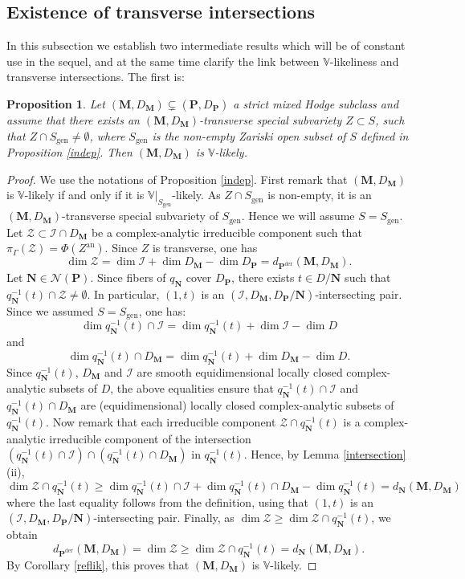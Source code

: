 \documentclass[10pt]{article}
\numberwithin{equation}{subsection}
\theoremstyle{plain}
\newtheorem{proposition}[theorem]{Proposition}
\theoremstyle{definition}
\theoremstyle{remark}
\newcommand{\I}{\mathscr{I}}
\newcommand{\V}{\mathbb V}
\newcommand{\pp}{\mathbf P}
\newcommand{\M}{\mathbf M}
\newcommand{\NN}{\mathbf N}
\newcommand{\an}{\mathrm{an}}
\newcommand{\der}{\mathrm{der}}
\newcommand{\Np}{\mathcal{N}(\pp)}
\newcommand{\gen}{\mathrm{gen}}
\newcommand{\Zcal}{\mathscr{Z}}
\begin{document}
\subsection{Existence of transverse intersections}
In this subsection we establish two intermediate results which will be of constant use in the sequel, and at the same time clarify the link between $\V$-likeliness and transverse intersections. The first is:
\begin{proposition}\label{nec}
Let $(\M, D_\M)\subsetneq (\pp,D_\pp)$ a strict mixed Hodge subclass and assume that there exists an $(\M,D_\M)$-transverse special subvariety $Z \subset S$, such that $Z \cap S_\gen \neq \emptyset$, where $S_\gen$ is the non-empty Zariski open subset of $S$ defined in Proposition \ref{indep}. Then $(\M,D_\M)$ is $\V$-likely.
\end{proposition}
\begin{proof}
We use the notations of Proposition \ref{indep}. First remark that $(\M,D_\M)$ is $\V$-likely if and only if it is $\V \vert_{S_\gen}$-likely. As $Z \cap S_\gen$ is non-empty, it is an $(\M,D_\M)$-transverse special subvariety of $S_\gen$. Hence we will assume $S = S_\gen$. Let $\Zcal \subset \I \cap D_\M$ be a complex-analytic irreducible component such that $\pi_\Gamma(\Zcal) = \Phi(Z^\an)$. Since $Z$ is transverse, one has
\[
\dim \Zcal = \dim \I + \dim D_\M - \dim D_\pp = d_{\pp^\der}(\M, D_\M).
\]
Let $\NN \in \Np$. Since fibers of $q_\NN$ cover $D_\pp$, there exists $t \in D/\NN$ such that $q_\NN^{-1}(t) \cap \Zcal \neq \emptyset$. In particular, $(1, t)$ is an $(\I, D_\M, D_\pp/\NN)$-intersecting pair. Since we assumed $S = S_\gen$, one has:
\[
\dim q_\NN^{-1}(t) \cap \I = \dim q_\NN^{-1}(t) + \dim \I - \dim D
\]
and
\[
\dim q_\NN^{-1}(t) \cap D_\M = \dim q_\NN^{-1}(t) + \dim D_\M - \dim D.
\]
Since $q_\NN^{-1}(t)$, $D_\M$ and $\I$ are smooth equidimensional locally closed complex-analytic subsets of $D$, the above equalities ensure that $q_\NN^{-1}(t) \cap \I$ and $q_\NN^{-1}(t) \cap D_\M$ are (equidimensional) locally closed complex-analytic subsets of $q_\NN^{-1}(t)$. Now remark that each irreducible component $\Zcal \cap q_\NN^{-1}(t)$ is a complex-analytic irreducible component of the intersection $(q_\NN^{-1}(t) \cap \I) \cap (q_\NN^{-1}(t) \cap D_\M)$ in $q_\NN^{-1}(t)$. Hence, by Lemma \ref{intersection}(ii),
\[
\dim \Zcal \cap q_\NN^{-1}(t) \geqslant \dim q_\NN^{-1}(t) \cap \I + \dim q_\NN^{-1}(t) \cap D_\M - \dim q_\NN^{-1}(t) = d_\NN(\M, D_\M)
\]
where the last equality follows from the definition, using that $(1,t)$ is an $(\I, D_\M, D_\pp/\NN)$-intersecting pair. Finally, as $\dim \Zcal \geqslant \dim \Zcal \cap q_\NN^{-1}(t)$, we obtain
\[
d_{\pp^\der}(\M,D_\M) = \dim \Zcal \geqslant \dim \Zcal \cap q_\NN^{-1}(t) = d_\NN(\M,D_\M).
\]
By Corollary \ref{reflik}, this proves that $(\M,D_\M)$ is $\V$-likely.
\end{proof}
\end{document}

